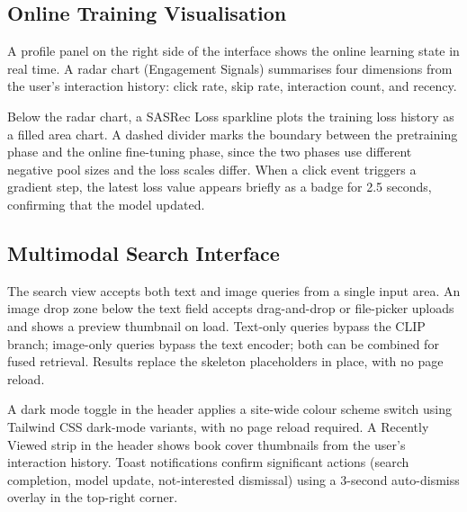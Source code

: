 \subsection{Online Training Visualisation}
\label{sec:training_viz}

A profile panel on the right side of the interface shows the online learning state in real time.
A radar chart (Engagement Signals) summarises four dimensions from the user's interaction history: click rate, skip rate, interaction count, and recency.

Below the radar chart, a SASRec Loss sparkline plots the training loss history as a filled area chart.
A dashed divider marks the boundary between the pretraining phase and the online fine-tuning phase, since the two phases use different negative pool sizes and the loss scales differ.
When a click event triggers a gradient step, the latest loss value appears briefly as a badge for 2.5 seconds, confirming that the model updated.

\subsection{Multimodal Search Interface}
\label{sec:multimodal_ui}

The search view accepts both text and image queries from a single input area.
An image drop zone below the text field accepts drag-and-drop or file-picker uploads and shows a preview thumbnail on load.
Text-only queries bypass the CLIP branch; image-only queries bypass the text encoder; both can be combined for fused retrieval.
Results replace the skeleton placeholders in place, with no page reload.

A dark mode toggle in the header applies a site-wide colour scheme switch using Tailwind CSS dark-mode variants, with no page reload required.
A Recently Viewed strip in the header shows book cover thumbnails from the user's interaction history.
Toast notifications confirm significant actions (search completion, model update, not-interested dismissal) using a 3-second auto-dismiss overlay in the top-right corner.
